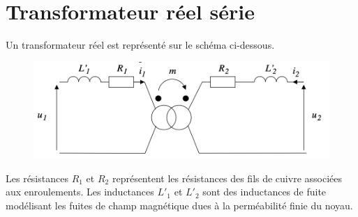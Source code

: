\documentclass{report}
\begin{document}
\section*{Transformateur réel série}

Un transformateur réel est représenté sur le schéma ci-dessous.

\begin{figure}[h!]
	\centering
		\includegraphics[scale=0.45]{transfo_reel.png}
\end{figure}	

Les résistances $R_1$ et $R_2$ représentent les résistances des fils de cuivre associées aux enroulements. Les inductances $L'_1$ et $L'_2$ sont des inductances de fuite modélisant les fuites de champ magnétique dues à la perméabilité finie du noyau.
\end{document}
